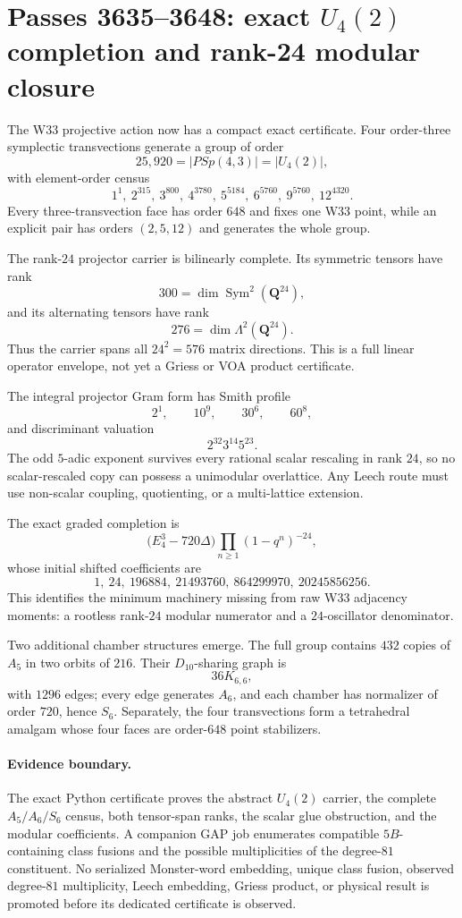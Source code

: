 \section{Passes 3635--3648: exact \texorpdfstring{$U_4(2)$}{U4(2)} completion and rank-24 modular closure}
\label{sec:pass3635-3648-monster-u42-completion}

The W33 projective action now has a compact exact certificate.  Four order-three symplectic transvections generate a group of order
\[
25{,}920=|PSp(4,3)|=|U_4(2)|,
\]
with element-order census
\[
1^1,\ 2^{315},\ 3^{800},\ 4^{3780},\ 5^{5184},\ 6^{5760},\ 9^{5760},\ 12^{4320}.
\]
Every three-transvection face has order $648$ and fixes one W33 point, while an explicit pair has orders $(2,5,12)$ and generates the whole group.

The rank-$24$ projector carrier is bilinearly complete.  Its symmetric tensors have rank
\[
300=\dim\operatorname{Sym}^2(\mathbf Q^{24}),
\]
and its alternating tensors have rank
\[
276=\dim\Lambda^2(\mathbf Q^{24}).
\]
Thus the carrier spans all $24^2=576$ matrix directions.  This is a full linear operator envelope, not yet a Griess or VOA product certificate.

The integral projector Gram form has Smith profile
\[
2^1,\qquad10^9,\qquad30^6,\qquad60^8,
\]
and discriminant valuation
\[
2^{32}3^{14}5^{23}.
\]
The odd $5$-adic exponent survives every rational scalar rescaling in rank $24$, so no scalar-rescaled copy can possess a unimodular overlattice.  Any Leech route must use non-scalar coupling, quotienting, or a multi-lattice extension.

The exact graded completion is
\[
\bigl(E_4^3-720\Delta\bigr)\prod_{n\ge1}(1-q^n)^{-24},
\]
whose initial shifted coefficients are
\[
1,\ 24,\ 196884,\ 21493760,\ 864299970,\ 20245856256.
\]
This identifies the minimum machinery missing from raw W33 adjacency moments: a rootless rank-$24$ modular numerator and a $24$-oscillator denominator.

Two additional chamber structures emerge.  The full group contains $432$ copies of $A_5$ in two orbits of $216$.  Their $D_{10}$-sharing graph is
\[
36K_{6,6},
\]
with $1296$ edges; every edge generates $A_6$, and each chamber has normalizer of order $720$, hence $S_6$.  Separately, the four transvections form a tetrahedral amalgam whose four faces are order-$648$ point stabilizers.

\paragraph{Evidence boundary.}
The exact Python certificate proves the abstract $U_4(2)$ carrier, the complete $A_5/A_6/S_6$ census, both tensor-span ranks, the scalar glue obstruction, and the modular coefficients.  A companion GAP job enumerates compatible $5B$-containing class fusions and the possible multiplicities of the degree-$81$ constituent.  No serialized Monster-word embedding, unique class fusion, observed degree-$81$ multiplicity, Leech embedding, Griess product, or physical result is promoted before its dedicated certificate is observed.
